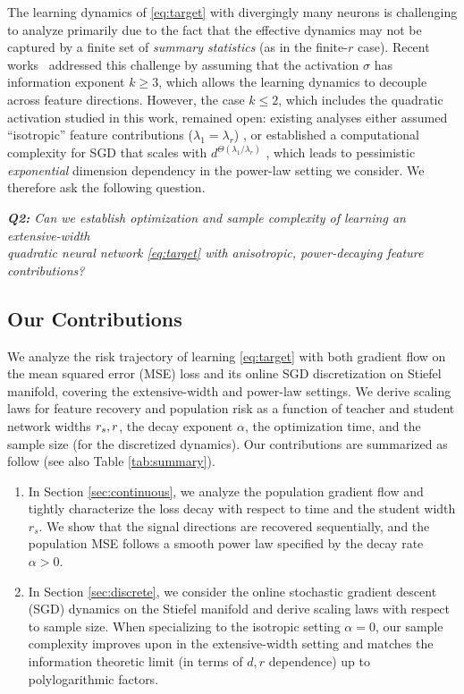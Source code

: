 The learning dynamics of \eqref{eq:target} with divergingly many neurons is challenging to analyze primarily due to the fact that the effective dynamics may not be captured by a finite set of \textit{summary statistics} \cite{benarous2022high} (as in the finite-$r$ case).  Recent works~\cite{oko2024learning,simsek2024learning} addressed this challenge by assuming that the activation $\sigma$ has information exponent $k \geq 3$, which allows the learning dynamics to decouple across feature directions. However, the case $k \le 2$, which includes the quadratic activation studied in this work, remained open: existing analyses either assumed ``isotropic'' feature contributions ($\lambda_1 = \lambda_{r}$) \cite{ren2024learning,simsek2024learning}, or established a computational complexity for SGD that scales with $d^{\Theta(\lambda_1 / \lambda_{r})}$ \cite{li2020learning}, which leads to pessimistic \textit{exponential} dimension dependency in the power-law setting we consider. We therefore ask the following question.
\begin{center}
    \textit{\textbf{Q2:} Can we establish optimization and sample complexity of learning an extensive-width \\ quadratic neural network \eqref{eq:target} with anisotropic, power-decaying feature contributions? } 
\end{center}

\vspace{-3.2mm}


\subsection{Our Contributions}  

%
We analyze the risk trajectory of learning \eqref{eq:target} with both gradient flow on the mean squared error (MSE) loss and its online SGD discretization on Stiefel manifold, covering the extensive-width and power-law settings. We derive scaling laws for feature recovery and population risk as a function of teacher and student network widths $r_s,r$, the decay exponent $\alpha$, the optimization time, and the sample size (for the discretized dynamics). Our contributions are summarized as follow (see also Table \ref{tab:summary}). 

\begin{enumerate}[leftmargin=*,topsep=0.75mm]
    \item In Section \ref{sec:continuous}, we analyze the population gradient flow and tightly characterize the loss decay with respect to time and the student width $r_s$. We show that the signal directions are recovered sequentially, and the population MSE follows a smooth power law specified by the decay rate $\alpha>0$. 
    \item  In Section \ref{sec:discrete}, we consider the online stochastic gradient descent (SGD) dynamics on the Stiefel manifold and derive scaling laws with respect to sample size. When specializing to the isotropic setting $\alpha=0$, our sample complexity improves upon \cite{ren2024learning} in the extensive-width setting and matches the information theoretic limit (in terms of $d,r$ dependence) up to polylogarithmic factors. 
\end{enumerate}
 

